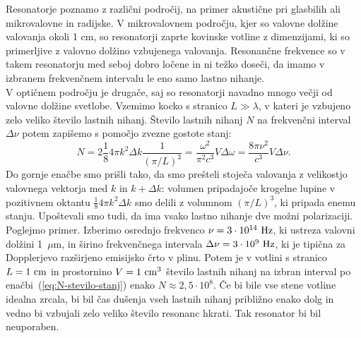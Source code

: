 \noindent
Resonatorje poznamo z različni področij, na primer akustične pri glasbilih ali 
mikrovalovne in radijske. V mikrovalovnem področju, kjer so valovne dolžine valovanja
okoli 1 cm, so resonatorji zaprte kovinske votline z dimenzijami, ki so primerljive z 
valovno dolžino vzbujenega valovanja. Resonančne frekvence so v takem resonatorju 
med seboj dobro ločene in ni težko doseči, da imamo v izbranem 
frekvenčnem intervalu le eno samo lastno nihanje.\\

\noindent
V optičnem področju je drugače, saj so resonatorji navadno mnogo večji
od valovne dolžine svetlobe. Vzemimo kocko s stranico $L\gg \lambda$, 
v kateri je vzbujeno zelo veliko število lastnih nihanj. Število lastnih nihanj $N$ 
na frekvenčni interval $\Delta \nu$ potem zapišemo s pomočjo zvezne gostote stanj:
\begin{equation}
N=2 \frac{1}{8} 4\pi k^{2}\Delta k \frac{1}{(\pi/L)^3}=\frac{\omega^{2}}{\pi^{2}c^{3}}V\Delta\omega=
\frac{8\pi \nu^{2}}{c^{3}}V\Delta\nu.
\label{eq:N-stevilo-stanj}
\end{equation}
Do gornje enačbe smo prišli tako, da smo prešteli stoječa valovanja z velikostjo
valovnega vektorja med $k$ in $k+\Delta k$: volumen pripadajoče krogelne lupine v pozitivnem oktantu
$\frac{1}{8} 4\pi k^{2}\Delta k$ smo delili z volumnom $(\pi/L)^3$, ki pripada enemu stanju. 
Upoštevali smo tudi, da ima vsako lastno nihanje dve možni polarizaciji.\\

\noindent
Poglejmo primer. Izberimo osrednjo frekvenco $\nu=3\cdot10^{14}~\hertz$, ki
ustreza valovni dolžini 1~$\mu$m, in širino frekvenčnega
intervala $\Delta\nu=3\cdot10^{9}~\hertz$, ki je tipična za Dopplerjevo
razširjeno emisijsko črto v plinu. Potem je v votlini s stranico $L=1~\centi\metre$ 
in prostornino $V=1~\centi\metre^3$ število lastnih nihanj na izbran interval 
po enačbi~(\ref{eq:N-stevilo-stanj}) enako
$N\approx2,5\cdot10^{8}$. Če bi bile vse stene votline idealna zrcala,
bi bil čas dušenja vseh lastnih nihanj približno enako dolg in vedno bi vzbujali
zelo veliko število resonanc hkrati. Tak resonator bi bil neuporaben.\\

